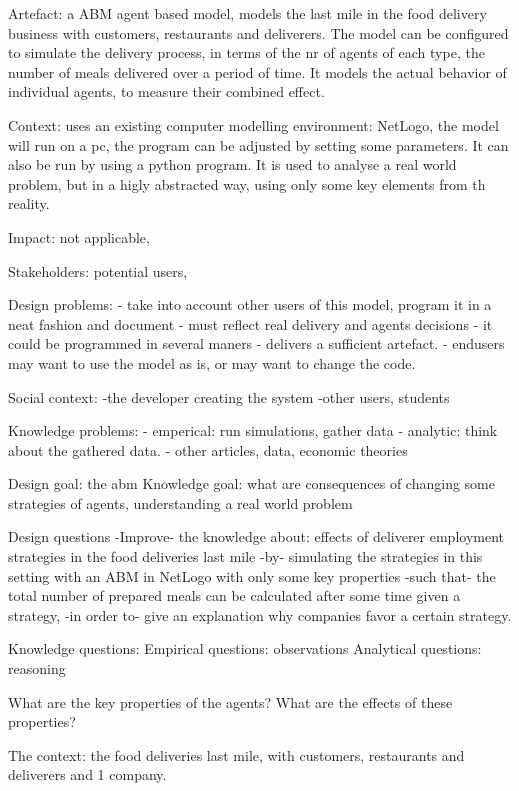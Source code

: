 
Artefact: a ABM agent based model, models the last mile in the food delivery business with customers, restaurants and deliverers.
The model can be configured to simulate the delivery process, in terms of the nr of agents of each type, the number of meals delivered
over a period of time.
It models the actual behavior of individual agents, to measure their combined effect.

Context: uses an existing computer modelling environment: NetLogo, the model will run on a pc, the program can be adjusted by setting some parameters.
It can also be run by using a python program.
It is used to analyse a real world problem, but in a higly abstracted way, using only some key elements from th reality.

Impact: not applicable,

Stakeholders: potential users,

Design problems:
- take into account other users of this model, program it in a neat fashion and document
- must reflect real delivery and agents decisions
- it could be programmed in several maners
- delivers a sufficient artefact.
- endusers may want to use the model as is, or may want to change the code.

Social context:
-the developer creating the system
-other users, students

Knowledge problems:
- emperical:  run simulations, gather data
- analytic: think about the gathered data.
- other articles, data, economic theories

Design goal: the abm
Knowledge goal: what are consequences of changing some strategies of agents, understanding a real world problem


Design questions
-Improve- the knowledge about: effects of deliverer employment strategies in the food deliveries last mile
-by- simulating the strategies in this setting with an ABM in NetLogo with only some key properties
-such that-
the total number of prepared meals can be calculated after some time given a strategy,
-in order to- give an explanation why companies favor a certain strategy.

Knowledge questions:
Empirical questions: observations
Analytical questions: reasoning

What are the key properties of the agents?
What are the effects of these properties?

The context: the food deliveries last mile, with customers, restaurants and deliverers and 1 company.

